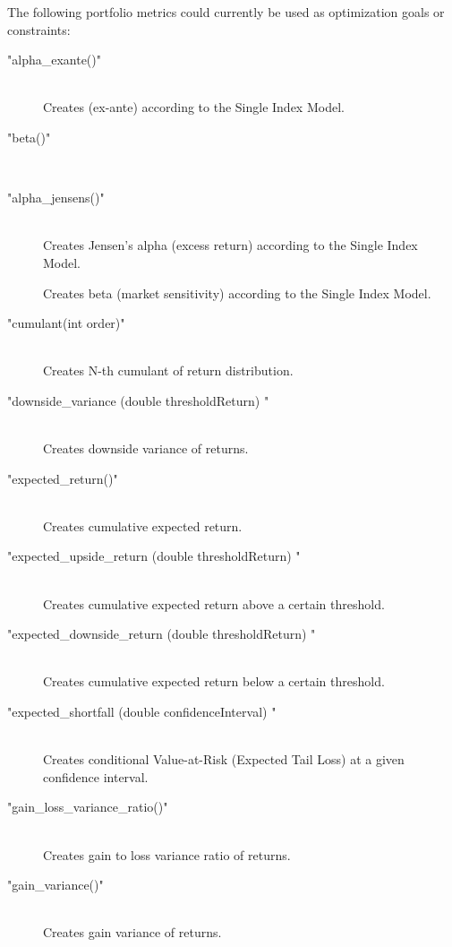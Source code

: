 \documentclass[letterpaper]{report}
\newcounter{N}
\begin{document}
The following portfolio metrics could currently be used as optimization goals or constraints:
 
 \begin{description} 
 
 \item["alpha\_exante()"] \hfill \\ 
Creates  (ex-ante) according to the Single Index Model.
 
 \item["beta()"] \hfill \\ 
\item["alpha\_jensens()"] \hfill \\ 
Creates  Jensen's alpha (excess return) according to the Single
 Index Model.

Creates  beta (market sensitivity) according to the Single Index
 Model.

\item["cumulant(int order)"] \hfill \\ 
		Creates N-th cumulant of  return distribution.

\item["downside\_variance (double thresholdReturn) "] \hfill \\ 
Creates downside variance of  returns.


\item["expected\_return()"] \hfill \\ 
Creates cumulative expected return.

 \item["expected\_upside\_return (double thresholdReturn) "] \hfill \\ 
Creates  cumulative expected return above a certain threshold.

\item["expected\_downside\_return (double thresholdReturn) "] \hfill \\ 
Creates  cumulative expected return below a certain threshold.


\item["expected\_shortfall (double confidenceInterval) "] \hfill \\ 
Creates  conditional Value-at-Risk (Expected Tail Loss) at a
 given confidence interval.

\item["gain\_loss\_variance\_ratio()"] \hfill \\ 
Creates gain to loss variance ratio of returns.

\item["gain\_variance()"] \hfill \\ 
Creates gain variance of returns.


\end{description}
\end{document}
